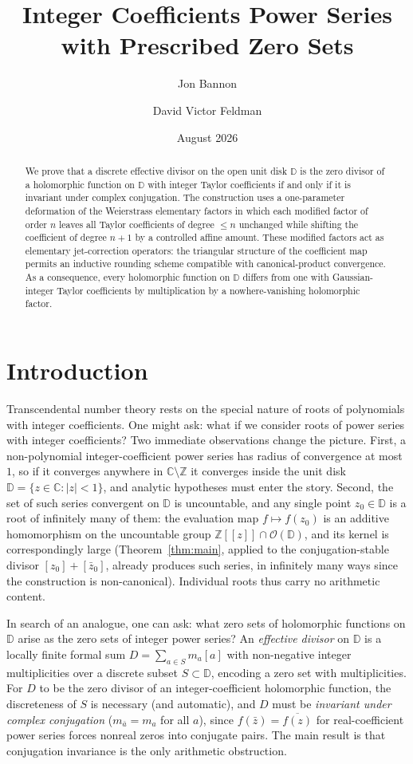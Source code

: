\documentclass[12pt]{amsart}
\title{Integer Coefficients Power Series\\with Prescribed Zero Sets }
\author{Jon Bannon}
\author{David Victor Feldman}
\date{August 2026}
\theoremstyle{definition}
\newcommand{\D}{\mathbb{D}}
\newcommand{\Z}{\mathbb{Z}}
\newcommand{\C}{\mathbb{C}}
\newcommand{\abs}[1]{\left|#1\right|}
\newcommand{\OD}{\mathcal{O}(\D)}
\begin{document}
\maketitle

\begin{abstract}
We prove that a discrete effective divisor on the open unit disk $\D$
is the zero divisor of a holomorphic function on $\D$ with integer
Taylor coefficients if and only if it is invariant under complex
conjugation.  The construction uses a one-parameter deformation of the
Weierstrass elementary factors in which each modified factor of order
$n$ leaves all Taylor coefficients of degree $\leq n$ unchanged while
shifting the coefficient of degree $n+1$ by a controlled affine amount.
These modified factors act as elementary jet-correction operators: the
triangular structure of the coefficient map permits an inductive
rounding scheme compatible with canonical-product convergence.  As a
consequence, every holomorphic function on $\D$ differs from one with
Gaussian-integer Taylor coefficients by multiplication by a
nowhere-vanishing holomorphic factor.
\end{abstract}

\section{Introduction}

Transcendental number theory rests on the special nature of roots of
polynomials with integer coefficients.  One might ask: what if we
consider roots of power series with integer coefficients?  Two immediate
observations change the picture.  First, a non-polynomial integer-coefficient
power series has radius of convergence at most~$1$, so if it converges
anywhere in $\C \setminus \Z$ it converges inside the unit disk $\D =
\{z \in \C : \abs{z} < 1\}$, and analytic hypotheses must enter the
story.  Second, the set of such series convergent on $\D$ is
uncountable, and any single point $z_0 \in \D$ is a root of infinitely
many of them: the evaluation map $f \mapsto f(z_0)$ is an additive
homomorphism on the uncountable group $\Z[[z]] \cap \OD$, and its
kernel is correspondingly large (Theorem~\ref{thm:main}, applied to the
conjugation-stable divisor $[z_0] + [\bar z_0]$, already produces such
series, in infinitely many ways since the construction is
non-canonical).  Individual roots thus carry no arithmetic content.

In search of an analogue, one
can ask: what zero sets of holomorphic functions on $\D$ arise as the
zero sets of integer power series?  An \emph{effective divisor} on $\D$
is a locally finite formal sum $D = \sum_{a \in S} m_a [a]$ with
non-negative integer multiplicities over a discrete subset $S \subset
\D$, encoding a zero set with multiplicities.  For $D$ to be the zero
divisor of an integer-coefficient holomorphic function, the discreteness
of $S$ is necessary (and automatic), and $D$ must be \emph{invariant
under complex conjugation} ($m_{\bar a} = m_a$ for all $a$), since
$f(\bar z) = \overline{f(z)}$ for real-coefficient power series forces
nonreal zeros into conjugate pairs.  The main result is that conjugation
invariance is the only arithmetic obstruction.
\end{document}
